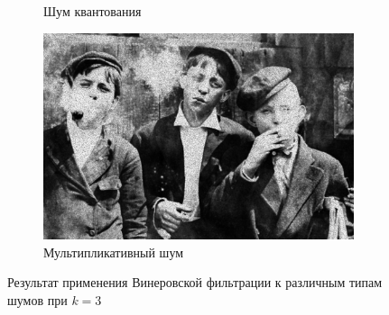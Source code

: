 \begin{figure}[ht!]
\begin{subfigure}[b]{0.5\linewidth}
      \caption{Шум квантования} 
      \label{weiner_3:e}
    \end{subfigure}%
    \begin{subfigure}[b]{0.5\linewidth}
        \centering
        \includegraphics[width=0.95\linewidth]{../Wiener_Filter/Wiener_Speckle_noise_(k=3).jpg} 
        \caption{Мультипликативный шум} 
        \label{weiner_3:f} 
    \end{subfigure} 
    \caption{Результат применения Винеровской фильтрации к различным типам шумов при $k = 3$}
    \label{img:weiner_3} 
\end{figure}

